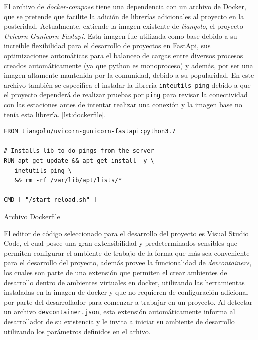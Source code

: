 El archivo de \textit{docker-compose} tiene una dependencia con un archivo de Docker, que se pretende que facilite la adición de librerías adicionales al proyecto en la posteridad. Actualmente, extiende la imagen existente de \textit{tiangolo}, el proyecto \textit{Uvicorn-Gunicorn-Fastapi}. Esta imagen fue utilizada como base debido a su increíble flexibilidad para el desarrollo de proyectos en FastApi, sus optimizaciones automáticas para el balanceo de cargas entre diversos procesos creados automáticamente (ya que python es monoproceso) y además, por ser una imagen altamente mantenida por la comunidad, debido a su popularidad. En este archivo también se especifíca el instalar la librería \texttt{inteutils-ping} debido a que el proyecto dependerá de realizar pruebas por \texttt{ping} para revisar la conectividad con las estaciones antes de intentar realizar una conexión y la imagen base no tenía esta librería. \ref{lst:dockerfile}.


\begin{listing}[h]
\begin{verbatim}
FROM tiangolo/uvicorn-gunicorn-fastapi:python3.7

# Installs lib to do pings from the server
RUN apt-get update && apt-get install -y \
   inetutils-ping \
   && rm -rf /var/lib/apt/lists/*

CMD [ "/start-reload.sh" ]
\end{verbatim}
\caption[Dockerfile]{Archivo Dockerfile}
\label{lst:dockerfile}
\end{listing}

El editor de código seleccionado para el desarrollo del proyecto es Visual Studio Code, el cual posee una gran extensibilidad y predeterminados sensibles que permiten configurar el ambiente de trabajo de la forma que más sea conveniente para el desarrollo del proyecto, además provee la funcionalidad de \textit{devcontainers}, los cuales son parte de una extensión que permiten el crear ambientes de desarrollo dentro de ambientes virtuales en docker, utilizando las herramientas instaladas en la imagen de docker y que no requieren de configuración adicional por parte del desarrollador para comenzar a trabajar en un proyecto. Al detectar un archivo \texttt{devcontainer.json}, esta extensión automáticamente informa al desarrollador de su existencia y le invita a iniciar su ambiente de desarrollo utilizando los parámetros definidos en el arhivo.

